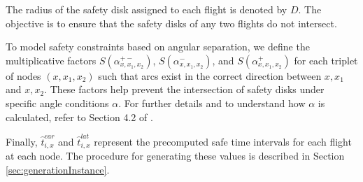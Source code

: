 \documentclass[../../thesis.tex]{subfiles}
\begin{document}
The radius of the safety disk assigned to each flight is denoted by \( D \). The objective is to ensure that the safety disks of any two flights do not intersect.  

To model safety constraints based on angular separation, we define the multiplicative factors \( S(\alpha^{+-}_{x,x_1,x_2}) \), \( S(\alpha^{-}_{x,x_1,x_2}) \), and \( S(\alpha^{+}_{x,x_1,x_2}) \) for each triplet of nodes \( (x, x_1, x_2) \) such that arcs exist in the correct direction between \( x, x_1 \) and \( x, x_2 \).  
These factors help prevent the intersection of safety disks under specific angle conditions \( \alpha \).  
For further details and to understand how \( \alpha \) is calculated, refer to Section 4.2 of \cite{pelegrin-2023}.  

Finally, \( \hat{t}^{ear}_{i,x} \) and \( \hat{t}^{lat}_{i,x} \) represent the precomputed safe time intervals for each flight at each node.  
The procedure for generating these values is described in Section \ref{sec:generationInstance}.  
\end{document}
